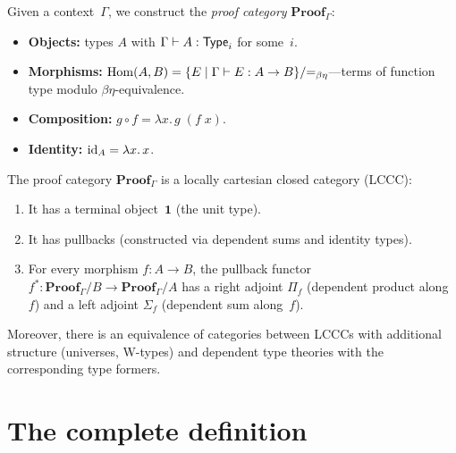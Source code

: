 \begin{construction}
\label{con:proof-category}
Given a context~$\Gamma$, we construct the \emph{proof category}
$\mathbf{Proof}_\Gamma$:
\begin{itemize}[nosep]
\item \textbf{Objects:} types $A$ with $\Gamma \vdash A : \mathsf{Type}_i$
  for some~$i$.
\item \textbf{Morphisms:} $\mathrm{Hom}(A,B) = \{E \mid
  \Gamma \vdash E : A \to B\} / {=_{\beta\eta}}$---terms of function
  type modulo $\beta\eta$-equivalence.
\item \textbf{Composition:} $g \circ f = \lambda x.\, g\;(f\;x)$.
\item \textbf{Identity:} $\mathrm{id}_A = \lambda x.\, x$.
\end{itemize}
\end{construction}

\begin{theorem}
\label{thm:lccc}
The proof category $\mathbf{Proof}_\Gamma$ is a locally cartesian
closed category (LCCC):
\begin{enumerate}[label=(\alph*),nosep]
\item It has a terminal object~$\mathbf{1}$ (the unit type).
\item It has pullbacks (constructed via dependent sums and identity
  types).
\item For every morphism $f : A \to B$, the pullback functor
  $f^* : \mathbf{Proof}_\Gamma / B \to
  \mathbf{Proof}_\Gamma / A$ has a right adjoint $\Pi_f$
  (dependent product along~$f$) and a left adjoint $\Sigma_f$
  (dependent sum along~$f$).
\end{enumerate}
Moreover, there is an equivalence of categories between LCCCs with
additional structure (universes, W-types) and dependent type theories
with the corresponding type formers.
\end{theorem}

\section{The complete definition}

